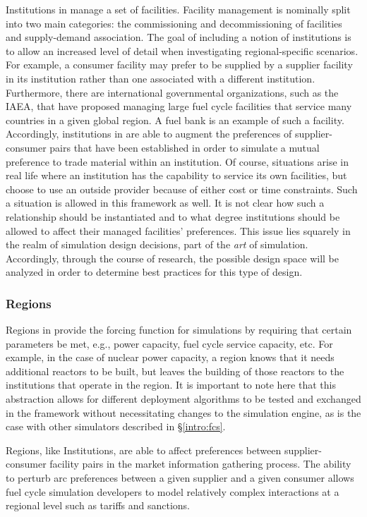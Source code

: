 Institutions in \Cyclus manage a set of facilities. Facility management is
nominally split into two main categories: the commissioning and decommissioning
of facilities and supply-demand association. The goal of including a notion of
institutions is to allow an increased level of detail when investigating
regional-specific scenarios. For example, a consumer facility may prefer to be
supplied by a supplier facility in its institution rather than one associated with
a different institution. Furthermore, there are international governmental
organizations, such as the IAEA, that have proposed managing large fuel cycle
facilities that service many countries in a given global region. A fuel bank is
an example of such a facility. Accordingly, institutions in \Cyclus are able to
augment the preferences of supplier-consumer pairs that have been established in
order to simulate a mutual preference to trade material within an
institution. Of course, situations arise in real life where an institution has
the capability to service its own facilities, but choose to use an outside
provider because of either cost or time constraints. Such a situation is allowed
in this framework as well. It is not clear how such a relationship should be
instantiated and to what degree institutions should be allowed to affect their
managed facilities' preferences. This issue lies squarely in the realm of
simulation design decisions, part of the \textit{art} of
simulation. Accordingly, through the course of research, the possible design
space will be analyzed in order to determine best practices for this type of
design.

\subsubsection{Regions}

Regions in \Cyclus provide the forcing function for simulations by requiring
that certain parameters be met, e.g., power capacity, fuel cycle service
capacity, etc. For example, in the case of nuclear power capacity, a region
knows that it needs additional reactors to be built, but leaves the building of
those reactors to the institutions that operate in the region. It is important
to note here that this abstraction allows for different deployment algorithms to
be tested and exchanged in the \Cyclus framework without necessitating changes
to the simulation engine, as is the case with other simulators described in
\S \ref{intro:fcs}.

Regions, like Institutions, are able to affect preferences between
supplier-consumer facility pairs in the market information gathering
process. The ability to perturb arc preferences between a given supplier and a
given consumer allows fuel cycle simulation developers to model relatively
complex interactions at a regional level such as tariffs and sanctions.

